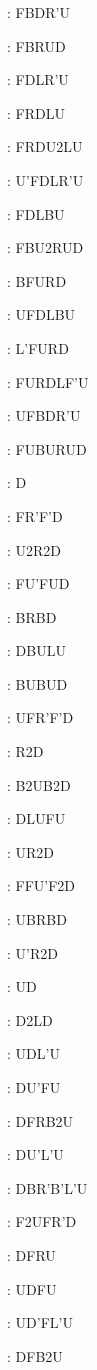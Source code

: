 \documentclass[9pt]{article}
\begin{document}
{\begin{multicols}{6}
: FBDR'U

: FBRUD

: FDLR'U

: FRDLU

: FRDU2LU

: U'FDLR'U

: FDLBU

: FBU2RUD

: BFURD

: UFDLBU

: L'FURD

: FURDLF'U

: UFBDR'U

: FUBURUD

: D

: FR'F'D

: U2R2D

: FU'FUD

: BRBD

: DBULU

: BUBUD

: UFR'F'D

: R2D

: B2UB2D

: DLUFU

: UR2D

: FFU'F2D

: UBRBD

: U'R2D

: UD

: D2LD

: UDL'U

: DU'FU

: DFRB2U

: DU'L'U

: DBR'B'L'U

: F2UFR'D

: DFRU

: UDFU

: UD'FL'U

: DFB2U


\end{multicols}}
\end{document}
